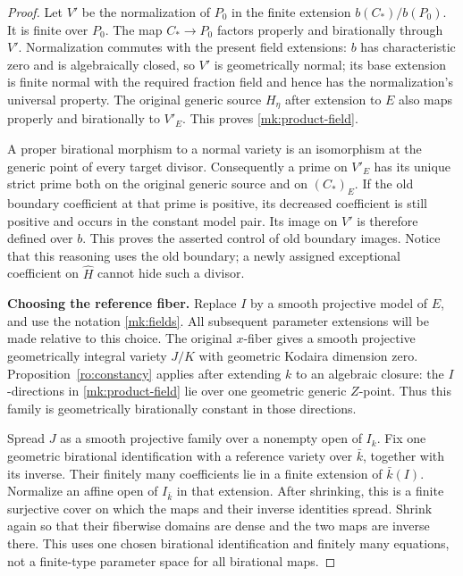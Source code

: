 \begin{proof}
Let $V'$ be the normalization of $P_0$ in the finite extension
$b(C_*)/b(P_0)$.  It is finite over $P_0$.  The map $C_*\to P_0$
factors properly and birationally through $V'$.  Normalization commutes
with the present field extensions: $b$ has characteristic zero and is
algebraically closed, so $V'$ is geometrically normal; its base extension
is finite normal with the required fraction field and hence has the
normalization's universal property.  The original generic source
$H_\eta$ after extension to $E$ also maps properly and birationally to
$V'_E$.  This proves \eqref{mk:product-field}.

A proper birational morphism to a normal variety is an isomorphism at
the generic point of every target divisor.  Consequently a prime on
$V'_E$ has its unique strict prime both on the original generic source
and on $(C_*)_E$.  If the old boundary coefficient at that prime is
positive, its decreased coefficient is still positive and occurs in
the constant model pair.  Its image on $V'$ is therefore defined over
$b$.  This proves the asserted control of old boundary images.  Notice
that this reasoning uses the old boundary; a newly assigned
exceptional coefficient on $\widehat H$ cannot hide such a divisor.

\smallskip\noindent\textbf{Choosing the reference fiber.}\enspace
Replace $I$ by a smooth projective model of $E$, and use the notation
\eqref{mk:fields}.  All subsequent parameter extensions will be made
relative to this choice.  The original $x$-fiber gives a smooth
projective geometrically integral variety $J/K$ with geometric Kodaira
dimension zero.  Proposition~\ref{ro:constancy} applies after extending
$k$ to an algebraic closure: the $I$-directions in
\eqref{mk:product-field} lie over one geometric generic $Z$-point.
Thus this family is geometrically birationally constant in those
directions.

Spread $J$ as a smooth projective family over a nonempty open of $I_k$.
Fix one geometric birational identification with a reference variety
over $\bar k$, together with its inverse. Their finitely many
coefficients lie in a finite extension of $\bar k(I)$. Normalize an
affine open of $I_{\bar k}$ in that extension. After shrinking, this
is a finite surjective cover on which the maps and their inverse
identities spread. Shrink again so that their fiberwise domains are
dense and the two maps are inverse there. This uses one chosen
birational identification and finitely many equations, not a
finite-type parameter space for all birational maps.


\end{proof}
